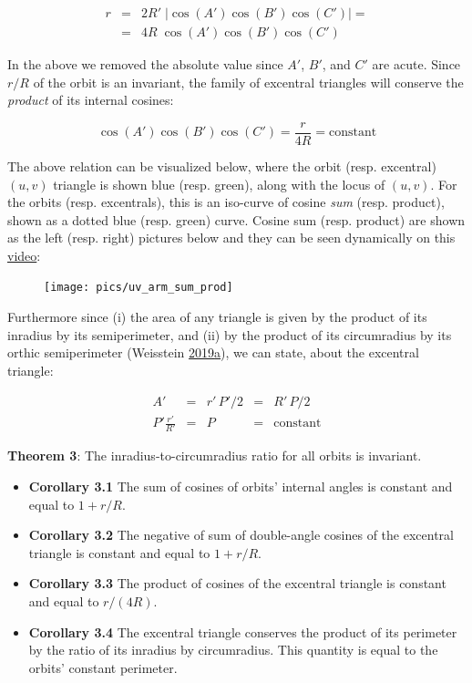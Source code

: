 \documentclass[]{article}
\providecommand{\tightlist}{%
  \setlength{\itemsep}{0pt}\setlength{\parskip}{0pt}}
\begin{document}
\[
\begin{array}{rcl}
r  & = & 2 R'\;|\cos(A')\cos(B')\cos(C')| = \\
  & = & 4 R\;\cos(A')\cos(B')\cos(C')
\end{array}
\]

In the above we removed the absolute value since \(A'\), \(B'\), and \(C'\) are acute. Since \(r/R\) of the orbit is an invariant, the family of excentral triangles will conserve the \emph{product} of its internal cosines:

\[
\cos(A')\cos(B')\cos(C') = \frac{r}{4R} = \text{constant}
\]

The above relation can be visualized below, where the orbit (resp. excentral) \((u,v)\) triangle is shown blue (resp. green), along with the locus of \((u,v)\). For the orbits (resp. excentrals), this is an iso-curve of cosine \emph{sum} (resp. product), shown as a dotted blue (resp. green) curve. Cosine sum (resp. product) are shown as the left (resp. right) pictures below and they can be seen dynamically on this \href{https://youtu.be/P8ykpE_ZbZ8}{video}:

\begin{figure}[H]

{\centering \texttt{[image: pics/uv\_arm\_sum\_prod]} 

}

\end{figure}

Furthermore since (i) the area of any triangle is given by the product of its inradius by its semiperimeter, and (ii) by the product of its circumradius by its orthic semiperimeter (Weisstein \protect\hyperlink{ref-mw}{2019}\protect\hyperlink{ref-mw}{a}), we can state, about the excentral triangle:

\[
\begin{array}{rclll}
A' & = & r'\,P'/2 & = & R'\,P/2 \\
P'\frac{r'}{R'} & = & P & = & \text{constant}
\end{array}
\]

\textbf{Theorem 3}: The inradius-to-circumradius ratio for all orbits is invariant.

\begin{itemize}
\tightlist
\item
  \textbf{Corollary 3.1} The sum of cosines of orbits' internal angles is constant and equal to \(1+r/R\).
\item
  \textbf{Corollary 3.2} The negative of sum of double-angle cosines of the excentral triangle is constant and equal to \(1+r/R\).
\item
  \textbf{Corollary 3.3} The product of cosines of the excentral triangle is constant and equal to \(r/(4R)\).
\item
  \textbf{Corollary 3.4} The excentral triangle conserves the product of its perimeter by the ratio of its inradius by circumradius. This quantity is equal to the orbits' constant perimeter.
\end{itemize}
\end{document}
